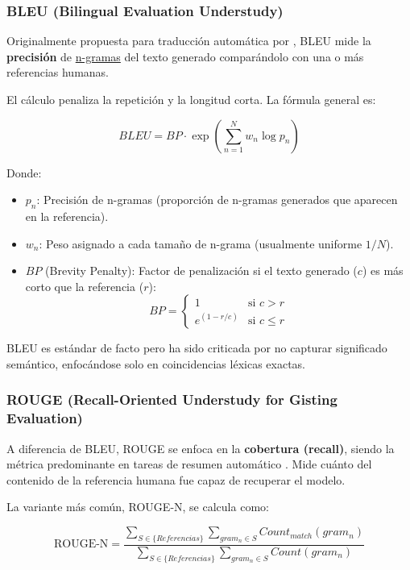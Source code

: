 \documentclass[11pt, a4paper]{article}
\begin{document}
\subsubsection{BLEU (Bilingual Evaluation Understudy)}
Originalmente propuesta para traducción automática por \cite{papineni_bleu_2001}, BLEU mide la \textbf{precisión} de \hyperlink{n-gram}{n-gramas} del texto generado comparándolo con una o más referencias humanas.

El cálculo penaliza la repetición y la longitud corta. La fórmula general es:

\begin{equation}
    BLEU = BP \cdot \exp\left( \sum_{n=1}^{N} w_n \log p_n \right)
\end{equation}

Donde:
\begin{itemize}
    \item $p_n$: Precisión de n-gramas (proporción de n-gramas generados que aparecen en la referencia).
    \item $w_n$: Peso asignado a cada tamaño de n-grama (usualmente uniforme $1/N$).
    \item $BP$ (Brevity Penalty): Factor de penalización si el texto generado ($c$) es más corto que la referencia ($r$):
    \begin{equation}
        BP = \begin{cases} 
        1 & \text{si } c > r \\
        e^{(1 - r/c)} & \text{si } c \le r 
        \end{cases}
    \end{equation}
\end{itemize}
BLEU es estándar de facto pero ha sido criticada por no capturar significado semántico, enfocándose solo en coincidencias léxicas exactas.

\subsubsection{ROUGE (Recall-Oriented Understudy for Gisting Evaluation)}
A diferencia de BLEU, ROUGE se enfoca en la \textbf{cobertura (recall)}, siendo la métrica predominante en tareas de resumen automático \cite{lin_rouge_nodate}. Mide cuánto del contenido de
la referencia humana fue capaz de recuperar el modelo.

La variante más común, ROUGE-N, se calcula como:

\begin{equation}
    \text{ROUGE-N} = \frac{\sum_{S \in \{Referencias\}} \sum_{gram_n \in S} Count_{match}(gram_n)}{\sum_{S \in \{Referencias\}} \sum_{gram_n \in S} Count(gram_n)}
\end{equation}
\end{document}
